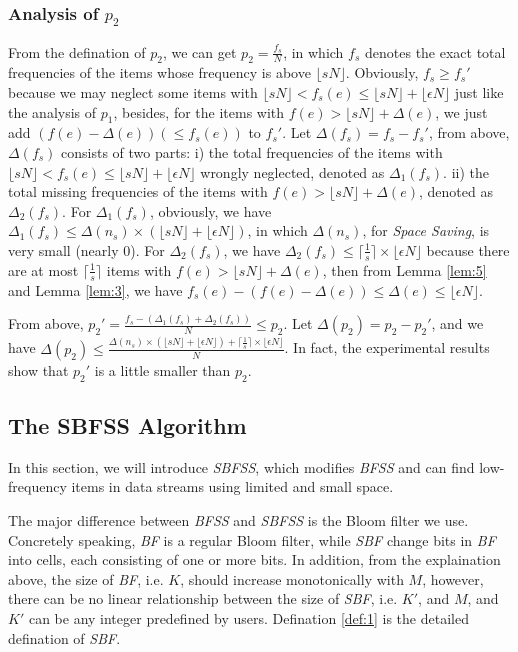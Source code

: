 \documentclass[conference]{IEEEtran}
\begin{document}
\subsubsection{\textbf{Analysis of $p_2$}}
From the defination of $p_2$, we can get $p_2=\frac{f_s}{N}$, in which $f_s$ denotes the exact total frequencies of the items whose frequency is above $\lfloor sN\rfloor$. Obviously, $f_s\geq f_s'$ because we may neglect some items with $\lfloor sN\rfloor<f_s(e)\leq\lfloor sN\rfloor+\lfloor \epsilon N\rfloor$ just like the analysis of $p_1$, besides, for the items with $f(e)>\lfloor sN\rfloor+\Delta(e)$, we just add $(f(e)-\Delta(e))(\leq f_s(e))$ to $f_s'$. Let $\Delta(f_s)=f_s-f_s'$, from above, $\Delta(f_s)$ consists of two parts: i) the total frequencies of the items with $\lfloor sN\rfloor<f_s(e)\leq\lfloor sN\rfloor+\lfloor \epsilon N\rfloor$ wrongly neglected, denoted as $\Delta_1(f_s)$. ii) the total missing frequencies of the items with $f(e)>\lfloor sN\rfloor+\Delta(e)$, denoted as $\Delta_2(f_s)$. For $\Delta_1(f_s)$, obviously, we have $\Delta_1(f_s)\leq\Delta(n_s)\times(\lfloor sN\rfloor+\lfloor \epsilon N\rfloor)$, in which $\Delta(n_s)$, for \emph{Space Saving}, is very small (nearly 0). For $\Delta_2(f_s)$, we have $\Delta_2(f_s)\leq\lceil\frac{1}{s}\rceil\times\lfloor\epsilon N\rfloor$ because there are at most $\lceil\frac{1}{s}\rceil$ items with $f(e)>\lfloor sN\rfloor+\Delta(e)$, then from Lemma \ref{lem:5} and Lemma \ref{lem:3}, we have $f_s(e)-(f(e)-\Delta(e))\leq\Delta(e)\leq\lfloor\epsilon N\rfloor$.\par
From above, $p_2'=\frac{f_s-(\Delta_1(f_s)+\Delta_2(f_s))}{N}\leq p_2$. Let $\Delta(p_2)=p_2-p_2'$, and we have $\Delta(p_2)\leq\frac{\Delta(n_s)\times(\lfloor sN\rfloor+\lfloor \epsilon N\rfloor)+\lceil\frac{1}{s}\rceil\times\lfloor\epsilon N\rfloor}{N}$. In fact, the experimental results show that $p_2'$ is a little smaller than $p_2$.

\subsection{The SBFSS Algorithm}\label{sec:sbfss}
In this section, we will introduce \emph{SBFSS}, which modifies \emph{BFSS} and can find low-frequency items in data streams using limited and small space.\par
The major difference between \emph{BFSS} and \emph{SBFSS} is the Bloom filter we use. Concretely speaking, \emph{BF} is a regular Bloom filter, while \emph{SBF} change bits in \emph{BF} into cells, each consisting of one or more bits. In addition, from the explaination above, the size of \emph{BF}, i.e. $K$, should increase monotonically with $M$, however, there can be no linear relationship between the size of \emph{SBF}, i.e. $K'$, and $M$, and $K'$ can be any integer predefined by users. Defination \ref{def:1} is the detailed defination of \emph{SBF}.\par  
\end{document}
